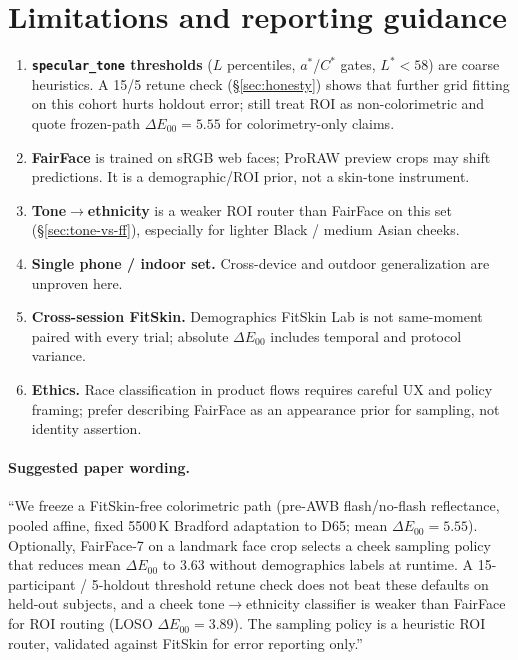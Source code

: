 \documentclass[11pt]{article}
\newcommand{\deee}{\ensuremath{\Delta E_{00}}}
\begin{document}
\section{Limitations and reporting guidance}

\begin{enumerate}[leftmargin=*]
  \item \textbf{\texttt{specular\_tone} thresholds} ($L$ percentiles, $a^*$/$C^*$ gates, $L^*{<}58$) are coarse heuristics.
    A 15/5 retune check (\S\ref{sec:honesty}) shows that further grid fitting on this cohort hurts holdout error; still treat ROI as non-colorimetric and quote frozen-path $\deee=\num{5.55}$ for colorimetry-only claims.
  \item \textbf{FairFace} is trained on sRGB web faces; ProRAW preview crops may shift predictions.
    It is a demographic/ROI prior, not a skin-tone instrument.
  \item \textbf{Tone$\to$ethnicity} is a weaker ROI router than FairFace on this set (\S\ref{sec:tone-vs-ff}), especially for lighter Black / medium Asian cheeks.
  \item \textbf{Single phone / indoor set.} Cross-device and outdoor generalization are unproven here.
  \item \textbf{Cross-session FitSkin.} Demographics FitSkin Lab is not same-moment paired with every trial; absolute $\deee$ includes temporal and protocol variance.
  \item \textbf{Ethics.} Race classification in product flows requires careful UX and policy framing; prefer describing FairFace as an appearance prior for sampling, not identity assertion.
\end{enumerate}

\paragraph{Suggested paper wording.}
``We freeze a FitSkin-free colorimetric path (pre-AWB flash/no-flash reflectance, pooled affine, fixed 5500\,K Bradford adaptation to D65; mean $\deee=\num{5.55}$).
Optionally, FairFace-7 on a landmark face crop selects a cheek sampling policy that reduces mean $\deee$ to $\num{3.63}$ without demographics labels at runtime.
A 15-participant / 5-holdout threshold retune check does not beat these defaults on held-out subjects, and a cheek tone$\to$ethnicity classifier is weaker than FairFace for ROI routing (LOSO $\deee=\num{3.89}$).
The sampling policy is a heuristic ROI router, validated against FitSkin for error reporting only.''
\end{document}
